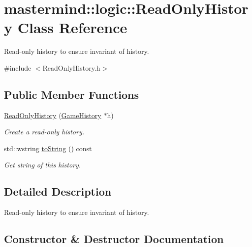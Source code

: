 \hypertarget{classmastermind_1_1logic_1_1_read_only_history}{}\section{mastermind\+:\+:logic\+:\+:Read\+Only\+History Class Reference}
\label{classmastermind_1_1logic_1_1_read_only_history}


Read-\/only history to ensure invariant of history.  




{\ttfamily \#include $<$Read\+Only\+History.\+h$>$}

\subsection*{Public Member Functions}
\begin{DoxyCompactItemize}
\item 
\hyperlink{classmastermind_1_1logic_1_1_read_only_history_a47c2ea23a91610532e19d1097d98492e}{Read\+Only\+History} (\hyperlink{classmastermind_1_1logic_1_1_game_history}{Game\+History} $\ast$h)
\begin{DoxyCompactList}\small\item\em Create a read-\/only history. \end{DoxyCompactList}\item 
std\+::wstring \hyperlink{classmastermind_1_1logic_1_1_read_only_history_a87011de9b87d3a754a64f0292ceaf10f}{to\+String} () const
\begin{DoxyCompactList}\small\item\em Get string of this history. \end{DoxyCompactList}\end{DoxyCompactItemize}


\subsection{Detailed Description}
Read-\/only history to ensure invariant of history. 

\subsection{Constructor \& Destructor Documentation}
\hypertarget{classmastermind_1_1logic_1_1_read_only_history_a47c2ea23a91610532e19d1097d98492e}{}\label{classmastermind_1_1logic_1_1_read_only_history_a47c2ea23a91610532e19d1097d98492e} 
